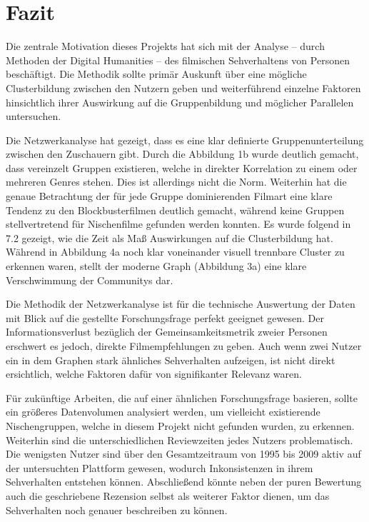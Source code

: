 \section{Fazit}

Die zentrale Motivation dieses Projekts hat sich mit der Analyse -- durch Methoden der Digital Humanities -- des filmischen Sehverhaltens von Personen beschäftigt.
Die Methodik sollte primär Auskunft über eine mögliche Clusterbildung zwischen den Nutzern geben und weiterführend einzelne Faktoren hinsichtlich ihrer Auswirkung auf die Gruppenbildung und möglicher Parallelen untersuchen.

Die Netzwerkanalyse hat gezeigt, dass es eine klar definierte Gruppenunterteilung zwischen den Zuschauern gibt.
Durch die Abbildung 1b wurde deutlich gemacht, dass vereinzelt Gruppen existieren, welche in direkter Korrelation zu einem oder mehreren Genres stehen.
Dies ist allerdings nicht die Norm.
Weiterhin hat die genaue Betrachtung der für jede Gruppe dominierenden Filmart eine klare Tendenz zu den Blockbusterfilmen deutlich gemacht, während keine Gruppen stellvertretend für Nischenfilme gefunden werden konnten.
Es wurde folgend in 7.2 gezeigt, wie die Zeit als Maß Auswirkungen auf die Clusterbildung hat.
Während in Abbildung 4a noch klar voneinander visuell trennbare Cluster zu erkennen waren, stellt der moderne Graph (Abbildung 3a) eine klare Verschwimmung der Communitys dar.

Die Methodik der Netzwerkanalyse ist für die technische Auswertung der Daten mit Blick auf die gestellte Forschungsfrage perfekt geeignet gewesen.
Der Informationsverlust bezüglich der Gemeinsamkeitsmetrik zweier Personen erschwert es jedoch, direkte Filmempfehlungen zu geben.
Auch wenn zwei Nutzer ein in dem Graphen stark ähnliches Sehverhalten aufzeigen, ist nicht direkt ersichtlich, welche Faktoren dafür von signifikanter Relevanz waren.

Für zukünftige Arbeiten, die auf einer ähnlichen Forschungsfrage basieren, sollte ein größeres Datenvolumen analysiert werden, um vielleicht existierende Nischengruppen, welche in diesem Projekt nicht gefunden wurden, zu erkennen.
Weiterhin sind die unterschiedlichen Reviewzeiten jedes Nutzers problematisch.
Die wenigsten Nutzer sind über den Gesamtzeitraum von 1995 bis 2009 aktiv auf der untersuchten Plattform gewesen, wodurch Inkonsistenzen in ihrem Sehverhalten entstehen können.
Abschließend könnte neben der puren Bewertung auch die geschriebene Rezension selbst als weiterer Faktor dienen, um das Sehverhalten noch genauer beschreiben zu können.




